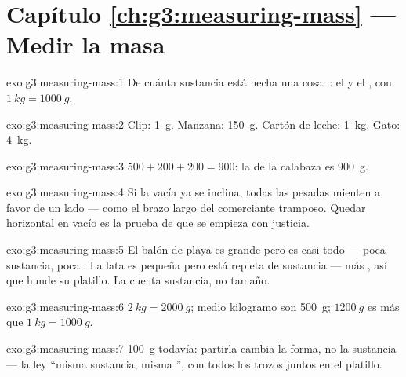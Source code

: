 \section*{Capítulo \ref{ch:g3:measuring-mass} --- Medir la masa}

\begin{solution}{exo:g3:measuring-mass:1}
De cuánta sustancia está hecha una cosa. : el  y el
, con $\qty{1}{kg} = \qty{1000}{g}$.
\end{solution}

\begin{solution}{exo:g3:measuring-mass:2}
Clip: \qty{1}{g}. Manzana: \qty{150}{g}. Cartón de leche:
\qty{1}{kg}. Gato: \qty{4}{kg}.
\end{solution}

\begin{solution}{exo:g3:measuring-mass:3}
$500 + 200 + 200 = 900$: la  de la calabaza es \qty{900}{g}.
\end{solution}

\begin{solution}{exo:g3:measuring-mass:4}
Si la  vacía ya se inclina, todas las pesadas mienten a favor
de un lado --- como el brazo largo del comerciante tramposo. Quedar
horizontal en vacío es la prueba de que se empieza con justicia.
\end{solution}

\begin{solution}{exo:g3:measuring-mass:5}
El balón de playa es grande pero es casi todo  --- poca
sustancia, poca . La lata es pequeña pero está repleta de
sustancia --- más , así que hunde su platillo. La  cuenta
sustancia, no tamaño.
\end{solution}

\begin{solution}{exo:g3:measuring-mass:6}
$\qty{2}{kg} = \qty{2000}{g}$; medio kilogramo son \qty{500}{g};
$\qty{1200}{g}$ es más que $\qty{1}{kg} = \qty{1000}{g}$.
\end{solution}

\begin{solution}{exo:g3:measuring-mass:7}
\qty{100}{g} todavía: partirla cambia la forma, no la sustancia ---
la ley ``misma sustancia, misma '', con todos los trozos juntos en
el platillo.
\end{solution}

